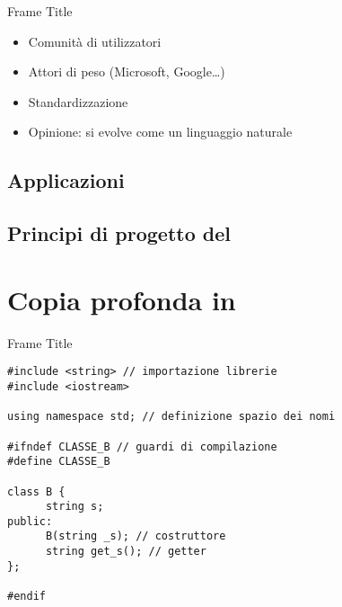 \documentclass[xcolor={dvipsnames, svgnames, x11names, table}, 10pt]{beamer}
\begin{document}



\begin{frame}{Frame Title}
    \begin{itemize}[<+- | alert@+>]
        \item Comunità di utilizzatori
        \item Attori di peso (Microsoft, Google\dots)
        \item Standardizzazione
        \item Opinione: si evolve come un linguaggio naturale
    \end{itemize}
\end{frame}

\subsection{Applicazioni}

\subsection{Principi di progetto del \cplusplus}

\section{Copia profonda in \cplusplus}

\begin{frame}[fragile]{Frame Title}
            \begin{verbatim}
#include <string> // importazione librerie
#include <iostream>

using namespace std; // definizione spazio dei nomi

#ifndef CLASSE_B // guardi di compilazione
#define CLASSE_B

class B {
      string s;
public:
      B(string _s); // costruttore
      string get_s(); // getter
};

#endif
            \end{verbatim}
\end{frame}
\end{document}
